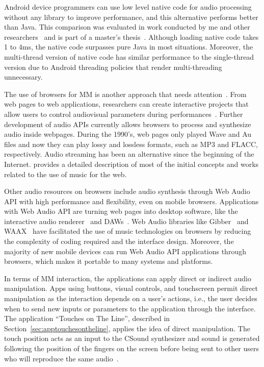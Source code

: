 Android device programmers can use low level native code for audio processing without any library to improve performance, and this alternative performs better than Java.
This comparison was evaluated in work conducted by me and other researchers~\citep{deCarvalhoJunior2013fftbenchmark} and is part of a master's  thesis~\citep{bianchi2014processamento}.
Although loading native code takes 1 to 4ms, the native code surpasses pure Java in most situations.
Moreover, the multi-thread version of native code has similar performance to the single-thread version due to Android threading policies that render multi-threading unnecessary.

The use of browsers for MM is another approach that needs attention~\citep{Wyse2013viability}.
From web pages to web applications, researchers  can create interactive projects that allow users to control audiovisual parameters during performances~\citep{Allison2013nexus,Weitzner2012massmobile}.
Further development of audio APIs currently allows browsers to process and synthesize audio inside webpages.
During the 1990's, web pages only played Wave and Au files and now they can play lossy and lossless formats, such as MP3 and FLACC, respectively.
Audio streaming has been an alternative since the beginning of the Internet.
\cite{Duckworth2005virtual} provides a detailed description of most of the initial concepts and works related to the use of music for the web.

Other audio resources on browsers include audio synthesis through Web Audio API with high performance and flexibility, even on mobile browsers.
Applications with Web Audio API are turning web pages into desktop software, like the interactive audio renderer~\citep{Matuszewski2016interactive} and DAWs~\citep{Kleimola2015daw}.
Web Audio libraries like Gibber~\citep{Roberts2012gibberlivecoding,Roberts2013webbrowser} and WAAX~\citep{Choi2013waax} have facilitated the use of music technologies on browsers by reducing the complexity of coding required and the interface design.
Moreover, the majority of new mobile devices can run Web Audio API applications through browsers, which makes it portable to many systems and platforms.

In terms of MM interaction, the applications can apply direct or indirect audio manipulation.
Apps using buttons, visual controls, and touchscreen permit direct manipulation as the interaction depends on a user's actions, i.e., the user decides when to send new inputs or parameters to the application through the interface.
The application ``Touches on The Line'', described in Section~\ref{sec:apptouchesontheline}, applies the idea of direct manipulation.
The touch position acts as an input to the CSound synthesizer and sound is generated following the position of the fingers on the screen before being sent to other users who will reproduce the same audio~\citep{deCarvalhoJunior2013touches}.

